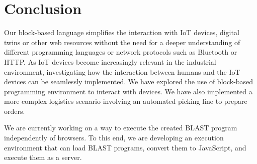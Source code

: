 \documentclass[runningheads]{llncs}
\begin{document}
\section{Conclusion}

Our block-based language simplifies the interaction with IoT devices, digital twins or other web resources without the need for a deeper understanding of different programming languages or network protocols such as Bluetooth or HTTP.
As IoT devices become increasingly relevant in the industrial environment, investigating how the interaction between humans and the IoT devices can be seamlessly implemented.
We have explored the use of block-based programming environment to interact with devices.
We have also implemented a more complex logistics scenario involving an automated picking line to prepare orders.

We are currently working on a way to execute the created BLAST program independently of browsers.
To this end, we are developing an execution environment that can load BLAST programs, convert them to JavaScript, and execute them as a server.

%
%
%


%
\end{document}

